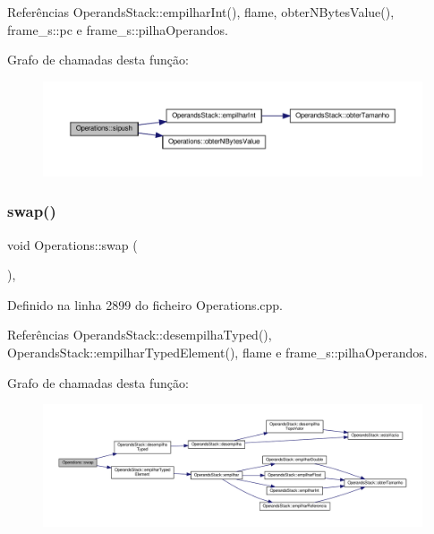 Referências Operands\+Stack\+::empilhar\+Int(), flame, obter\+N\+Bytes\+Value(), frame\+\_\+s\+::pc e frame\+\_\+s\+::pilha\+Operandos.

Grafo de chamadas desta função\+:
\nopagebreak
\begin{figure}[H]
\begin{center}
\leavevmode
\includegraphics[width=350pt]{classOperations_aed3838c73d7febfcacab9f101e6946ad_cgraph}
\end{center}
\end{figure}
\mbox{\label{classOperations_ad800d04ce11806455dd5b84a7ecd6144}} 
\subsubsection{\texorpdfstring{swap()}{swap()}}
{\footnotesize\ttfamily void Operations\+::swap (\begin{DoxyParamCaption}{ }\end{DoxyParamCaption})\hspace{0.3cm}{\ttfamily [static]}, {\ttfamily [private]}}



Definido na linha 2899 do ficheiro Operations.\+cpp.



Referências Operands\+Stack\+::desempilha\+Typed(), Operands\+Stack\+::empilhar\+Typed\+Element(), flame e frame\+\_\+s\+::pilha\+Operandos.

Grafo de chamadas desta função\+:
\nopagebreak
\begin{figure}[H]
\begin{center}
\leavevmode
\includegraphics[width=350pt]{classOperations_ad800d04ce11806455dd5b84a7ecd6144_cgraph}
\end{center}
\end{figure}
\mbox{\label{classOperations_a72955f43cde98b73c503e1a8c1505352}} 
